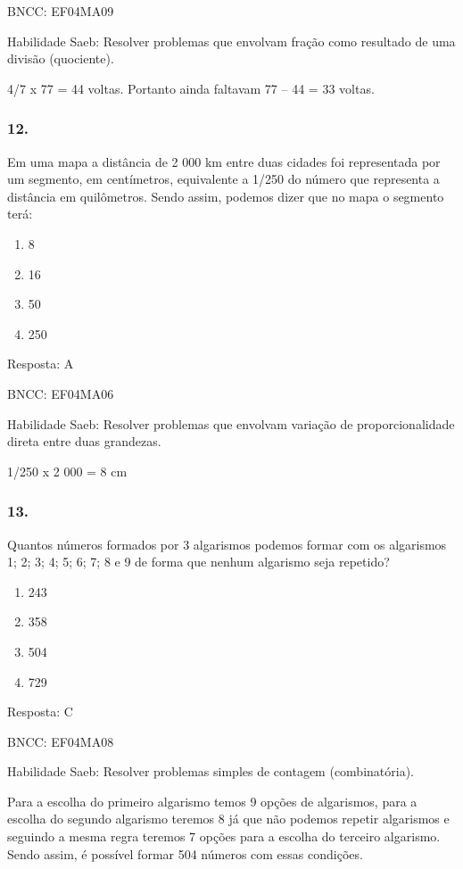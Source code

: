 BNCC: EF04MA09

Habilidade Saeb: Resolver problemas que envolvam fração como resultado
de uma divisão (quociente).

4/7 x 77 = 44 voltas. Portanto ainda faltavam 77 -- 44 = 33 voltas.

\subsubsection{12.}\label{section-198}

Em uma mapa a distância de 2 000 km entre duas cidades foi representada
por um segmento, em centímetros, equivalente a 1/250 do número que
representa a distância em quilômetros. Sendo assim, podemos dizer que no
mapa o segmento terá:

\begin{enumerate}
\def\labelenumi{\alph{enumi})}
\item
  8
\item
  16
\item
  50
\item
  250
\end{enumerate}

Resposta: A

BNCC: EF04MA06

Habilidade Saeb: Resolver problemas que envolvam variação de
proporcionalidade direta entre duas grandezas.

1/250 x 2 000 = 8 cm

\subsubsection{13.}\label{section-199}

Quantos números formados por 3 algarismos podemos formar com os
algarismos 1; 2; 3; 4; 5; 6; 7; 8 e 9 de forma que nenhum algarismo seja
repetido?

\begin{enumerate}
\def\labelenumi{\alph{enumi})}
\item
  243
\item
  358
\item
  504
\item
  729
\end{enumerate}

Resposta: C

BNCC: EF04MA08

Habilidade Saeb: Resolver problemas simples de contagem (combinatória).

Para a escolha do primeiro algarismo temos 9 opções de algarismos, para
a escolha do segundo algarismo teremos 8 já que não podemos repetir
algarismos e seguindo a mesma regra teremos 7 opções para a escolha do
terceiro algarismo. Sendo assim, é possível formar 504 números com essas
condições.

